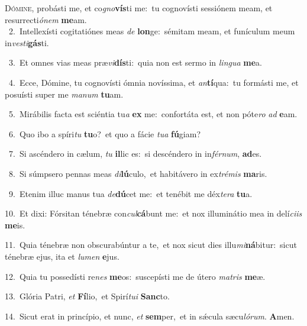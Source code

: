 \lettrine{\initial\textcolor{\initialcolor}{D}}{ómine,} probásti me, et co\-\textit{gno}\-\textbf{vís}ti me:~\star tu cognovísti sessiónem meam, et resurrecti\-\textit{ó}\-\textit{nem} \textbf{me}\-am.\\
{\numbfont\textcolor{\numbcolor}{~2.}}~Intellexísti cogitatiónes meas \textit{de} \textbf{lon}\-ge:~\star sémitam meam, et funículum meum in\-\textit{ves}\-\textit{ti}\textbf{gás}ti.\par
{\numbfont\textcolor{\numbcolor}{~3.}}~Et omnes vias meas præ\-\textit{vi}\-\textbf{dís}ti:~\star quia non est sermo in \textit{lin}\-\textit{gua} \textbf{me}\-a.\par
{\numbfont\textcolor{\numbcolor}{~4.}}~Ecce, Dómine, tu cognovísti ómnia novíssima, et \textit{an}\-\textbf{tí}qua:~\star tu formásti me, et posuísti super me \textit{ma}\-\textit{num} \textbf{tu}\-am.\par
{\numbfont\textcolor{\numbcolor}{~5.}}~Mirábilis facta est sciéntia tu\textit{a} \textbf{ex} me:~\star confortáta est, et non póte\textit{ro} \textit{ad} \textbf{e}\-am.\par
{\numbfont\textcolor{\numbcolor}{~6.}}~Quo ibo a spíri\textit{tu} \textbf{tu}\-o?~\star et quo a fácie \textit{tu}\-\textit{a} \textbf{fú}\-giam?\par
{\numbfont\textcolor{\numbcolor}{~7.}}~Si ascéndero in cælum, \textit{tu} \textbf{il}\-lic es:~\star si descéndero in in\-\textit{fér}\-\textit{num}, \textbf{ad}\-es.\par
{\numbfont\textcolor{\numbcolor}{~8.}}~Si súmpsero pennas meas \textit{di}\-\textbf{lú}culo,~\star et habitávero in ex\-\textit{tré}\-\textit{mis} \textbf{ma}\-ris.\par
{\numbfont\textcolor{\numbcolor}{~9.}}~Etenim illuc manus tua \textit{de}\-\textbf{dú}cet me:~\star et tenébit me déx\-\textit{te}\-\textit{ra} \textbf{tu}\-a.\par
{\numbfont\textcolor{\numbcolor}{10.}}~Et dixi: Fórsitan ténebræ con\-\textit{cul}\-\textbf{cá}bunt me:~\star et nox illuminátio mea in delí\-\textit{ci}\-\textit{is} \textbf{me}\-is.\par
{\numbfont\textcolor{\numbcolor}{11.}}~Quia ténebræ non obscurabúntur a te,~\dagger et nox sicut dies illu\-\textit{mi}\-\textbf{ná}bitur:~\star sicut ténebræ ejus, ita et \textit{lu}\-\textit{men} \textbf{e}\-jus.\par
{\numbfont\textcolor{\numbcolor}{12.}}~Quia tu possedísti re\textit{nes} \textbf{me}\-os:~\star suscepísti me de útero \textit{ma}\-\textit{tris} \textbf{me}\-æ.\par
{\numbfont\textcolor{\numbcolor}{13.}}~Glória Patri, \textit{et} \textbf{Fí}\-lio,~\star et Spirí\-\textit{tu}\-\textit{i} \textbf{Sanc}\-to.\par
{\numbfont\textcolor{\numbcolor}{14.}}~Sicut erat in princípio, et nunc, \textit{et} \textbf{sem}\-per,~\star et in sǽcula sæcu\-\textit{ló}\-\textit{rum}. \textbf{A}\-men.\par
